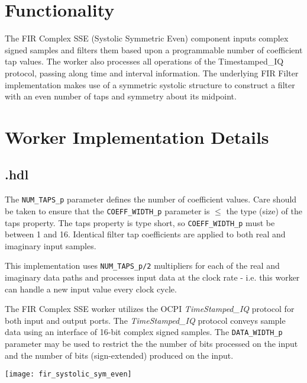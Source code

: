 \section*{Functionality}
\begin{flushleft}
	The FIR Complex SSE (Systolic Symmetric Even) component inputs complex signed samples and filters them based upon a programmable number of coefficient tap values. The worker also processes all operations of the Timestamped\_IQ protocol, passing along time and interval information. The underlying FIR Filter implementation makes use of a symmetric systolic structure to construct a filter with an even number of taps and symmetry about its midpoint.
\end{flushleft}

\section*{Worker Implementation Details}
\subsection*{\comp.hdl}
\begin{flushleft}
	The \verb+NUM_TAPS_p+ parameter defines the number of coefficient values. Care should be taken to ensure that the \verb+COEFF_WIDTH_p+ parameter is $\le$ the type (size) of the taps property. The taps property is type short, so \verb+COEFF_WIDTH_p+ must be between 1 and 16. Identical filter tap coefficients are applied to both real and imaginary input samples.\medskip

	This implementation uses \verb+NUM_TAPS_p/2+ multipliers for each of the real and imaginary data paths and processes input data at the clock rate - i.e. this worker can handle a new input value every clock cycle.\medskip
	
	The FIR Complex SSE worker utilizes the OCPI \textit{TimeStamped\_IQ} protocol for both input and output ports. The \textit{TimeStamped\_IQ} protocol conveys sample data using an interface of 16-bit complex signed samples. The \verb+DATA_WIDTH_p+ parameter may be used to restrict the the number of bits processed on the input and the number of bits (sign-extended) produced on the input.
\end{flushleft}
{\centering\captionsetup{type=figure}\texttt{[image: fir\_systolic\_sym\_even]}\par{}\label{fig:circuit}}

